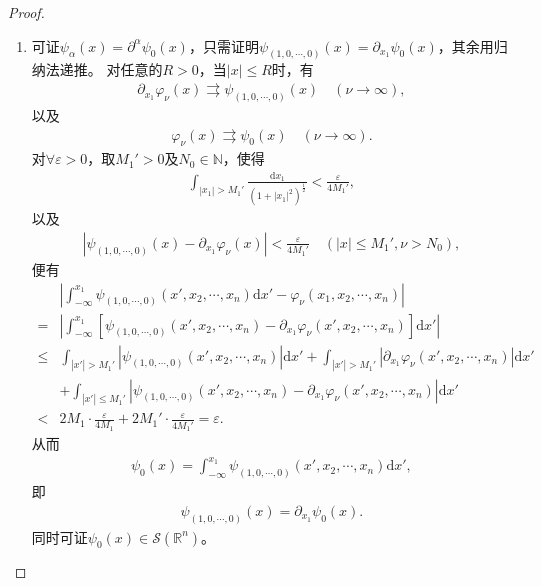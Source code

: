 \documentclass[../../main.tex]{subfiles}%
\begin{document}
\begin{proof}
\begin{enumerate}[(1)]
\item 可证$\psi_\alpha(x)=\partial^\alpha\psi_0(x)$，只需证明$\psi_{(1,0,\cdots,0)}(x)=\partial_{x_1}\psi_0(x)$，其余用归纳法递推。
对任意的$R>0$，当$|x|\leqslant R$时，有
\begin{align*}
\partial_{x_1}\varphi_\nu(x)\rightrightarrows\psi_{(1,0,\cdots,0)}(x)\quad(\nu\to\infty),
\end{align*}
以及
\begin{align*}
\varphi_\nu(x)\rightrightarrows\psi_0(x)\quad(\nu\to\infty).
\end{align*}
对$\forall\varepsilon>0$，取$M_1'>0$及$N_0\in\mathbb{N}$，使得
\begin{align*}
\int_{|x_1|>M_1'}\frac{\mathrm{d}x_1}{(1+|x_1|^2)^{\frac{1}{2}}}<\frac{\varepsilon}{4M_1'},
\end{align*}
以及
\begin{align*}
\left|\psi_{(1,0,\cdots,0)}(x)-\partial_{x_1}\varphi_\nu(x)\right|<\frac{\varepsilon}{4M_1'}\quad(|x|\leqslant M_1',\nu>N_0),
\end{align*}
便有
\begin{align*}
&\left|\int_{-\infty}^{x_1}\psi_{(1,0,\cdots,0)}(x',x_2,\cdots,x_n)\mathrm{d}x'-\varphi_\nu(x_1,x_2,\cdots,x_n)\right|\\
=&\left|\int_{-\infty}^{x_1}\left[\psi_{(1,0,\cdots,0)}(x',x_2,\cdots,x_n)-\partial_{x_1}\varphi_\nu(x',x_2,\cdots,x_n)\right]\mathrm{d}x'\right|\\
\leqslant&\int_{|x'|>M_1'}\left|\psi_{(1,0,\cdots,0)}(x',x_2,\cdots,x_n)\right|\mathrm{d}x'+\int_{|x'|>M_1'}\left|\partial_{x_1}\varphi_\nu(x',x_2,\cdots,x_n)\right|\mathrm{d}x'\\
&+\int_{|x'|\leqslant M_1'}\left|\psi_{(1,0,\cdots,0)}(x',x_2,\cdots,x_n)-\partial_{x_1}\varphi_\nu(x',x_2,\cdots,x_n)\right|\mathrm{d}x'\\
<&2M_1\cdot\frac{\varepsilon}{4M_1}+2M_1'\cdot\frac{\varepsilon}{4M_1'}=\varepsilon.
\end{align*}
从而
\begin{align*}
\psi_0(x)=\int_{-\infty}^{x_1}\psi_{(1,0,\cdots,0)}(x',x_2,\cdots,x_n)\mathrm{d}x',
\end{align*}
即
\begin{align*}
\psi_{(1,0,\cdots,0)}(x)=\partial_{x_1}\psi_0(x).
\end{align*}
同时可证$\psi_0(x)\in\mathscr{S}(\mathbb{R}^n)$。


\end{enumerate}
\end{proof}
\end{document}
